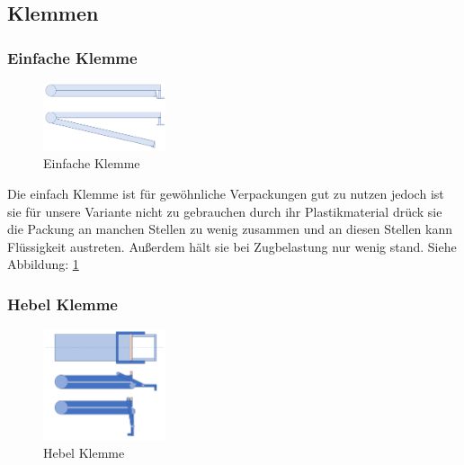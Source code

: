 \subsection{Klemmen}
\subsubsection{Einfache Klemme}

\begin{figure}
\vspace{-20pt}
  \begin{center}
    \includegraphics[width=0.32\textwidth]{Bilder/Powerpoint/Einfach_Klemme}
  \end{center}
  \caption{Einfache Klemme}
  \label{Einfache Klemme}
  \vspace{-30pt}
\end{figure}

Die einfach Klemme ist für gewöhnliche Verpackungen gut zu nutzen jedoch ist sie für unsere Variante nicht zu gebrauchen durch ihr Plastikmaterial drück sie die Packung an manchen Stellen zu wenig zusammen und an diesen Stellen kann Flüssigkeit austreten. Außerdem hält sie bei Zugbelastung nur wenig stand. Siehe Abbildung: \ref{Einfache Klemme}

\subsubsection{Hebel Klemme} 

\begin{figure}
\vspace{-30pt}
  \begin{center}
    \includegraphics[width=0.32\textwidth]{Bilder/Powerpoint/Hebel_Klemme}
  \end{center}
  \caption{Hebel Klemme}
  \label{Hebel Klemme}
  \vspace{-80pt}
\end{figure}

